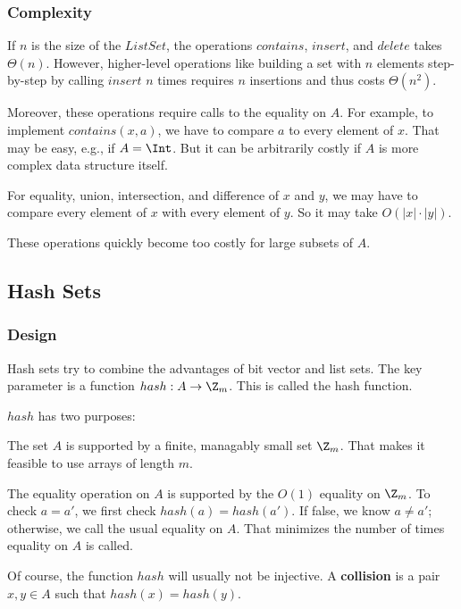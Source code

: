 \subsubsection{Complexity}
If $n$ is the size of the $ListSet$, the operations $contains$, $insert$, and $delete$ takes $\Theta(n)$.
However, higher-level operations like building a set with $n$ elements step-by-step by calling $insert$ $n$ times requires $n$ insertions and thus costs $\Theta(n^2)$.

Moreover, these operations require calls to the equality on $A$.
For example, to implement $contains(x,a)$, we have to compare $a$ to every element of $x$.
That may be easy, e.g., if $A=\Int$.
But it can be arbitrarily costly if $A$ is more complex data structure itself.

For equality, union, intersection, and difference of $x$ and $y$, we may have to compare every element of $x$ with every element of $y$.
So it may take $O(|x|\cdot|y|)$.

These operations quickly become too costly for large subsets of $A$.

\subsection{Hash Sets}\label{sec:ad:hashset}

\subsubsection{Design}
Hash sets try to combine the advantages of bit vector and list sets.
The key parameter is a function $hash:A\to \Z_m$.
This is called the hash function.

$hash$ has two purposes:
\begin{compactitem}
 \item The set $A$ is supported by a finite, managably small set $\Z_m$.
   That makes it feasible to use arrays of length $m$.
 \item The equality operation on $A$ is supported by the $O(1)$ equality on $\Z_m$.
   To check $a=a'$, we first check $hash(a)=hash(a')$.
   If false, we know $a\neq a'$; otherwise, we call the usual equality on $A$.
   That minimizes the number of times equality on $A$ is called.
\end{compactitem}

Of course, the function $hash$ will usually not be injective.
A \textbf{collision} is a pair $x,y\in A$ such that $hash(x)=hash(y)$.

